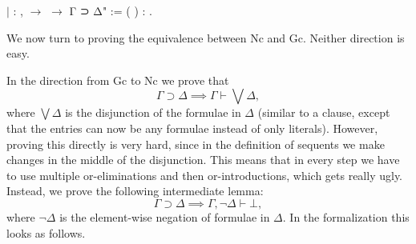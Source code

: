 \documentclass{article}
\newenvironment{code}%
 {\small\begin{list}{}%
         {\setlength{\leftmargin}{10mm}}%
         \item[]%
 }
 {\end{list}}
\begin{document}
\begin{code}
\coqdocnoindent
\ensuremath{|}   : \coqdockw{\ensuremath{\forall}}         ,            \ensuremath{\rightarrow}           \ensuremath{\rightarrow}   \coqdoceol
\coqdocnoindent
{} Γ ⊃ Δ" := (  ) : .\coqdoceol
\end{code}
We now turn to proving the equivalence between Nc and Gc. Neither direction is easy.

In the direction from Gc to Nc we prove that
$$\Gamma\supset\Delta\implies\Gamma\vdash\bigvee\Delta,$$
where $\bigvee\Delta$ is the disjunction of the formulae in $\Delta$ (similar to a clause, except that the entries can now be any formulae instead of only literals). However, proving this directly is very hard, since in the definition of sequents we make changes in the middle of the disjunction. This means that in every step we have to use multiple or-eliminations and then or-introductions, which gets really ugly. Instead, we prove the following intermediate lemma:
$$\Gamma\supset\Delta\implies\Gamma,\neg\Delta\vdash\bot,$$
where $\neg\Delta$ is the element-wise negation of formulae in $\Delta$. In the formalization this looks as follows.
\end{document}
